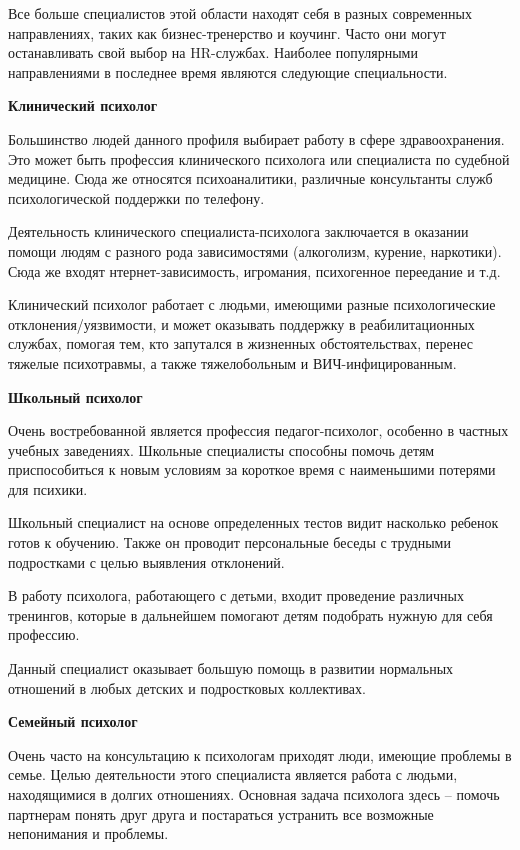 Все больше специалистов этой области находят себя в разных современных направлениях, таких как бизнес-тренерство и коучинг. Часто они могут останавливать свой выбор на HR-службах. Наиболее популярными направлениями в последнее время являются следующие специальности.

\textbf{Клинический психолог}

Большинство людей данного профиля выбирает работу в сфере здравоохранения. Это может быть профессия клинического психолога или специалиста по судебной медицине. Сюда же относятся психоаналитики, различные консультанты служб психологической поддержки по телефону.

Деятельность клинического специалиста-психолога заключается в оказании помощи людям с разного рода зависимостями (алкоголизм, курение, наркотики). Сюда же входят нтернет-зависимость, игромания, психогенное переедание и т.д.

Клинический психолог работает с людьми, имеющими разные психологические отклонения/уязвимости, и может оказывать поддержку в реабилитационных службах, помогая тем, кто запутался в жизненных обстоятельствах, перенес тяжелые психотравмы, а также тяжелобольным и ВИЧ-инфицированным.

\textbf{Школьный психолог}

Очень востребованной является профессия педагог-психолог, особенно в частных учебных заведениях. Школьные специалисты способны помочь детям приспособиться к новым условиям за короткое время с наименьшими потерями для психики.

Школьный специалист на основе определенных тестов видит насколько ребенок готов к обучению. Также он проводит персональные беседы с трудными подростками с целью выявления отклонений.

В работу психолога, работающего с детьми, входит проведение различных тренингов, которые в дальнейшем помогают детям подобрать нужную для себя профессию.

Данный специалист оказывает большую помощь в развитии нормальных отношений в любых детских и подростковых коллективах.

\textbf{Семейный психолог}

Очень часто на консультацию к психологам приходят люди, имеющие проблемы в семье. Целью деятельности этого специалиста является работа с людьми, находящимися в долгих отношениях. Основная задача психолога здесь – помочь партнерам понять друг друга и постараться устранить все возможные непонимания и проблемы.

